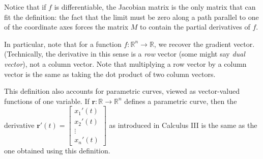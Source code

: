 
Notice that if $f$ is differentiable, the Jacobian matrix is the only matrix that can fit the definition: the fact that the limit must be zero along a path parallel to one of the coordinate axes forces the matrix $M$ to contain the partial derivatives of $f$.

In particular, note that for a function $f:\mathbb{R}^n\to \mathbb{R}$, we recover the gradient vector. (Technically, the derivative in this sense is a \emph{row} vector (some might say \emph{dual vector}), not a column vector.  Note that multiplying a row vector by a column vector is the same as taking the dot product of two column vectors. 

This definition also accounts for parametric curves, viewed as vector-valued functions of one variable. If $\mathbf{r}:\mathbb{R}\to \mathbb{R}^n$ defines a parametric curve, then the derivative $\mathbf{r}'(t) = \begin{bmatrix}x_1'(t)\\x_2'(t)\\\vdots \\x_n'(t)\end{bmatrix}$ as introduced in Calculus III is the same as the one obtained using this definition.


